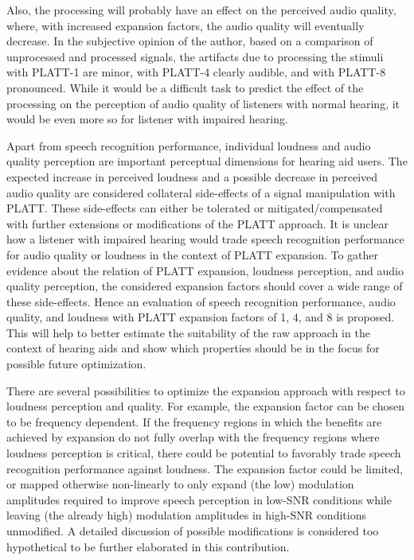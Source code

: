 \documentclass[10pt,a4paper,twocolumn]{article}
\begin{document}
%
Also, the processing will probably have an effect on the perceived audio quality, where, with increased expansion factors, the audio quality will eventually decrease.
%
In the subjective opinion of the author, based on a comparison of unprocessed and processed signals, the artifacts due to processing the stimuli with PLATT-1 are minor, with PLATT-4 clearly audible, and with PLATT-8 pronounced.
%
While it would be a difficult task to predict the effect of the processing on the perception of audio quality of listeners with normal hearing, it would be even more so for listener with impaired hearing.

Apart from speech recognition performance, individual loudness and audio quality perception are important perceptual dimensions for hearing aid users.
%
The expected increase in perceived loudness and a possible decrease in perceived audio quality are considered collateral side-effects of a signal manipulation with PLATT.
%
These side-effects can either be tolerated or mitigated/compensated with further extensions or modifications of the PLATT approach.
%
It is unclear how a listener with impaired hearing would trade speech recognition performance for audio quality or loudness in the context of PLATT expansion.
%
To gather evidence about the relation of PLATT expansion, loudness perception, and audio quality perception, the considered expansion factors should cover a wide range of these side-effects.
%
Hence an evaluation of speech recognition performance, audio quality, and loudness with PLATT expansion factors of 1, 4, and 8 is proposed.
%
This will help to better estimate the suitability of the raw approach in the context of hearing aids and show which properties should be in the focus for possible future optimization.

There are several possibilities to optimize the expansion approach with respect to loudness perception and quality.
%
For example, the expansion factor can be chosen to be frequency dependent.
%
If the frequency regions in which the benefits are achieved by expansion do not fully overlap with the frequency regions where loudness perception is critical, there could be potential to favorably trade speech recognition performance against loudness.
%
The expansion factor could be limited, or mapped otherwise non-linearly to only expand (the low) modulation amplitudes required to improve speech perception in low-SNR conditions while leaving (the already high) modulation amplitudes in high-SNR conditions unmodified.
%
A detailed discussion of possible modifications is considered too hypothetical to be further elaborated in this contribution.
\end{document}

